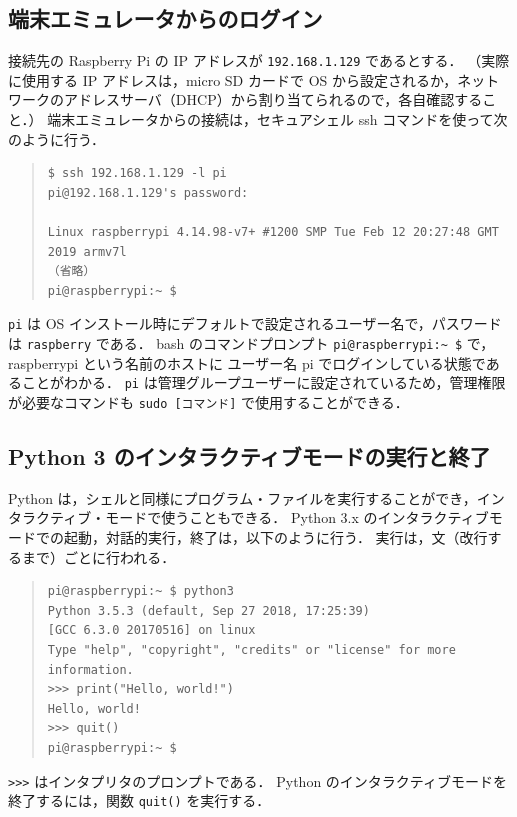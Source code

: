 \documentclass[11pt,a4,epsf]{report}
\begin{document}
\subsection{端末エミュレータからのログイン}

接続先の Raspberry Pi の IP アドレスが \verb+192.168.1.129+ であるとする．
（実際に使用する IP アドレスは，micro SD カードで OS から設定されるか，ネットワークのアドレスサーバ（DHCP）から割り当てられるので，各自確認すること．）
端末エミュレータからの接続は，セキュアシェル ssh コマンドを使って次のように行う．
\begin{quote}
\small
\begin{verbatim}
$ ssh 192.168.1.129 -l pi
pi@192.168.1.129's password: 

Linux raspberrypi 4.14.98-v7+ #1200 SMP Tue Feb 12 20:27:48 GMT 2019 armv7l
（省略）
pi@raspberrypi:~ $ 
\end{verbatim}
\end{quote}
\verb+pi+ は OS インストール時にデフォルトで設定されるユーザー名で，パスワードは \verb+raspberry+ である．
bash のコマンドプロンプト \verb+pi@raspberrypi:~ $+ で，raspberrypi という名前のホストに ユーザー名 pi でログインしている状態であることがわかる．
\verb+pi+ は管理グループユーザーに設定されているため，管理権限が必要なコマンドも \verb+sudo [コマンド]+ で使用することができる．

\subsection{Python 3 のインタラクティブモードの実行と終了}

Python は，シェルと同様にプログラム・ファイルを実行することができ，インタラクティブ・モードで使うこともできる．
Python 3.x のインタラクティブモードでの起動，対話的実行，終了は，以下のように行う．
実行は，文（改行するまで）ごとに行われる．
\begin{quote}
\small
\begin{verbatim}
pi@raspberrypi:~ $ python3
Python 3.5.3 (default, Sep 27 2018, 17:25:39) 
[GCC 6.3.0 20170516] on linux
Type "help", "copyright", "credits" or "license" for more information.
>>> print("Hello, world!")
Hello, world!
>>> quit()
pi@raspberrypi:~ $ 
\end{verbatim}
\end{quote}
\verb+>>>+ はインタプリタのプロンプトである．
Python のインタラクティブモードを終了するには，関数 \verb+quit()+ を実行する．
\end{document}
